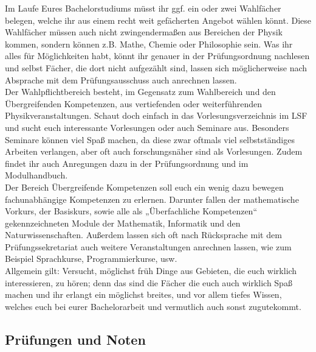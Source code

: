 Im Laufe Eures Bachelorstudiums müsst ihr ggf. ein oder zwei Wahlfächer belegen, welche ihr aus einem recht weit gefächerten Angebot wählen könnt. Diese Wahlfächer müssen auch nicht zwingendermaßen aus Bereichen der Physik kommen, sondern können z.B. Mathe, Chemie oder Philosophie sein. Was ihr alles für Möglichkeiten habt, könnt ihr genauer in der Prüfungsordnung nachlesen und selbst Fächer, die dort nicht aufgezählt sind, lassen sich möglicherweise nach Absprache mit dem Prüfungsausschuss auch anrechnen lassen.\\

Der Wahlpflichtbereich besteht, im Gegensatz zum Wahlbereich und den Übergreifenden Kompetenzen, aus vertiefenden oder weiterführenden Physikveranstaltungen. Schaut doch einfach in das Vorlesungsverzeichnis im LSF und sucht euch interessante Vorlesungen oder auch Seminare aus. Besonders Seminare können viel Spaß machen, da diese zwar oftmals viel selbstständiges Arbeiten verlangen, aber oft auch forschungsnäher sind als Vorlesungen. Zudem findet ihr auch Anregungen dazu in der Prüfungsordnung und im Modulhandbuch.\\

Der Bereich Übergreifende Kompetenzen soll euch ein wenig dazu bewegen fachunabhängige Kompetenzen zu erlernen. Darunter fallen der mathematische Vorkurs, der Basiskurs, sowie alle als „Überfachliche Kompetenzen“ gekennzeichneten Module der Mathematik, Informatik und den Naturwissenschaften. Außerdem lassen sich oft nach Rücksprache mit dem Prüfungssekretariat auch weitere Veranstaltungen anrechnen lassen, wie zum Beispiel Sprachkurse, Programmierkurse, usw.\\

Allgemein gilt: Versucht, möglichst früh Dinge aus Gebieten, die euch wirklich interessieren, zu hören; denn das sind die Fächer die euch auch wirklich Spaß machen und ihr erlangt ein möglichst breites, und vor allem tiefes Wissen, welches euch bei eurer Bachelorarbeit und vermutlich auch sonst zugutekommt.

\subsection{Prüfungen und Noten}

